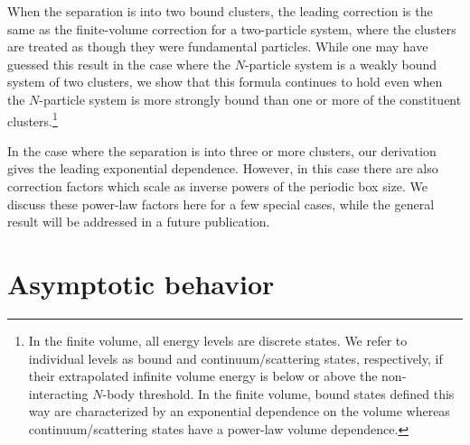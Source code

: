 \documentclass[aps,singlecolumn,superscriptaddress,nofootinbib,tightenlines,
preprintnumbers,showkeys]{revtex4-1}
\begin{document}
When the separation is into two bound clusters, the leading correction is the 
same as the finite-volume correction for a two-particle system, where the 
clusters are treated as though they were fundamental particles.  While one may 
have guessed this result in the case where the $N$-particle system is a weakly 
bound system of two clusters, we show that this formula continues to hold 
even when the $N$-particle system is more strongly bound than one or more of 
the constituent clusters.\footnote{In the finite volume, all energy levels are 
discrete states.  We refer to individual levels as bound and 
continuum/scattering states, respectively, if their extrapolated infinite 
volume energy is below or above the non-interacting $N$-body threshold.  In the 
finite volume, bound states defined this way are characterized by an exponential 
dependence on the volume whereas continuum/scattering states have a power-law 
volume dependence.}

In the case where the separation is into three or more clusters, our derivation 
gives the leading exponential dependence.  However, in this case there are also 
correction factors which scale as inverse powers of the periodic box size.  We 
discuss these power-law factors here for a few special cases, while the general 
result will be addressed in a future publication.

\section{Asymptotic behavior}
\end{document}
